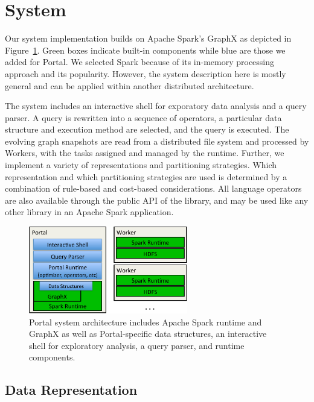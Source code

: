 \section{System}
\label{sec:sys}

Our \ql system implementation builds on Apache Spark's GraphX as
depicted in Figure~\ref{fig:arch}.  Green boxes indicate built-in
components while blue are those we added for Portal.  We selected
Spark because of its in-memory processing approach and its popularity.
However, the system description here is mostly general and can be
applied within another distributed architecture.

The \ql system includes an interactive shell for exporatory data
analysis and a query parser.  A \ql query is rewritten into a sequence
of operators, a particular data structure and execution method are
selected, and the query is executed.  The evolving graph snapshots are
read from a distributed file system and processed by Workers, with the
tasks assigned and managed by the runtime.  
Further, we implement a variety of \tg representations and
partitioning strategies.  Which representation and which partitioning
strategies are used is determined by a combination of rule-based and
cost-based considerations.  All language operators are also available
through the public API of the \ql library, and may be used like any
other library in an Apache Spark application.

\begin{figure}[t!]
\includegraphics[height=1.5in]{figs/architecture.pdf}
\caption{Portal system architecture includes Apache Spark runtime and
  GraphX as well as Portal-specific data structures, an interactive
  shell for exploratory analysis, a query parser, and runtime
  components. }
\label{fig:arch}
\end{figure}

\subsection{Data Representation}
\label{subsec:datastructs}


